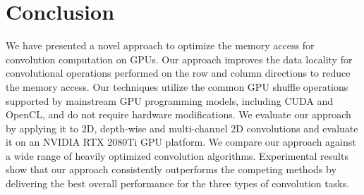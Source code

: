 \section{Conclusion}
We have presented a novel approach to optimize the memory access for convolution computation on GPUs. Our approach improves the data
locality for convolutional operations performed on the row and column directions to reduce the memory access. Our techniques utilize the
common GPU shuffle operations supported by mainstream GPU programming models, including CUDA and OpenCL, and do not require hardware
modifications. We evaluate our approach by applying it to 2D, depth-wise and multi-channel 2D convolutions and evaluate it on an NVIDIA RTX
2080Ti GPU platform. We compare our approach against a wide range of heavily optimized convolution algorithms. Experimental results show
that our approach consistently outperforms the competing methods by delivering the best overall performance for the three types of
convolution tasks.




